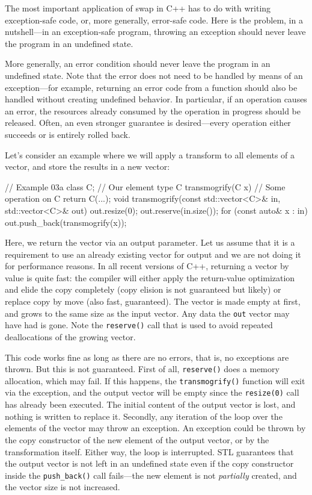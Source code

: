 The most important application of swap in C++ has to do with writing exception-safe code, or, more generally, error-safe code. Here is the problem, in a nutshell---in an exception-safe program, throwing an exception should never leave the program in an undefined state.

More generally, an error condition should never leave the program in an undefined state. Note that the error does not need to be handled by means of an exception---for example, returning an error code from a function should also be handled without creating undefined behavior. In particular, if an operation causes an error, the resources already consumed by the operation in progress should be released. Often, an even stronger guarantee is desired---every operation either succeeds or is entirely rolled back.

Let's consider an example where we will apply a transform to all elements of a vector, and store the results in a new vector:

\begin{code}
// Example 03a
class C;            // Our element type
C transmogrify(C x) {    // Some operation on C
  return C(...);
}
void transmogrify(const std::vector<C>& in,
                  std::vector<C>& out) {
  out.resize(0);
  out.reserve(in.size());
  for (const auto& x : in) {
    out.push_back(transmogrify(x));
  }
}
\end{code}

Here, we return the vector via an output parameter. Let us assume that it is a requirement to use an already existing vector for output and we are not doing it for performance reasons. In all recent versions of C++, returning a vector by value is quite fast: the compiler will either apply the return-value optimization and elide the copy completely (copy elision is not guaranteed but likely) or replace copy by move (also fast, guaranteed). The vector is made empty at first, and grows to the same size as the input vector. Any data the \texttt{out} vector may have had is gone. Note the \texttt{reserve()} call that is used to avoid repeated deallocations of the growing vector.

This code works fine as long as there are no errors, that is, no exceptions are thrown. But this is not guaranteed. First of all, \texttt{reserve()} does a memory allocation, which may fail. If this happens, the \texttt{transmogrify()} function will exit via the exception, and the output vector will be empty since the \texttt{resize(0)} call has already been executed. The initial content of the output vector is lost, and nothing is written to replace it. Secondly, any iteration of the loop over the elements of the vector may throw an exception. An exception could be thrown by the copy constructor of the new element of the output vector, or by the transformation itself. Either way, the loop is interrupted. STL guarantees that the output vector is not left in an undefined state even if the copy constructor inside the \texttt{push\_back()} call fails---the new element is not \emph{partially} created, and the vector size is not increased.

